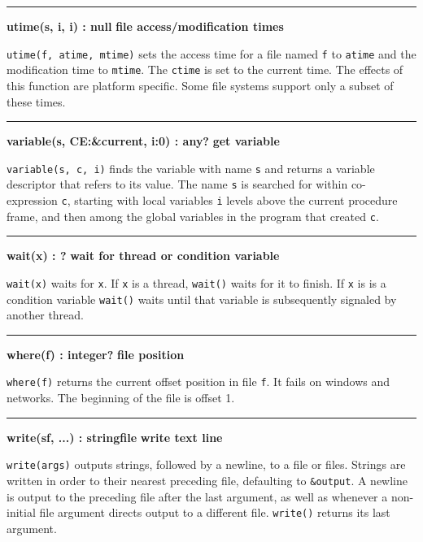 \bigskip\hrule\vspace{0.1cm}
\noindent
{\bf utime(s, i, i) : null } \hfill {\bf file access/modification times}

\noindent
\texttt{utime(f, atime, mtime)} sets the access
time for a file named \texttt{f} to \texttt{atime} and the modification
time to \texttt{mtime}. The \texttt{ctime} is set to the current time.
The effects of this function are platform specific. Some file systems
support only a subset of these times.

\bigskip\hrule\vspace{0.1cm}
\noindent
{\bf variable(s, CE:\&current, i:0) : any? } \hfill {\bf get variable}

\noindent
{}\texttt{variable(s, c, i)} finds the variable
with name \texttt{s} and returns a variable descriptor that refers to
its value. The name \texttt{s} is searched for within co-expression
\texttt{c}, starting with local variables \texttt{i} levels above the
current procedure frame, and then among the global variables in the
program that created \texttt{c}.

\bigskip\hrule\vspace{0.1cm}
\noindent
{\bf wait(x) : ? } \hfill {\bf wait for thread or condition variable}

\noindent
{}\texttt{wait(x)} waits for \texttt{x}. If \texttt{x} is
a thread, \texttt{wait()} waits for it to finish. If \texttt{x} is
is a condition variable \texttt{wait()} waits until that variable is
subsequently signaled by another thread.

\bigskip\hrule\vspace{0.1cm}
\noindent
{\bf where(f) : integer? } \hfill {\bf file position}

\noindent
{}\texttt{where(f)} returns the
current offset position in file \texttt{f}. It fails on windows and
networks. The beginning of the file is offset 1.

\bigskip\hrule\vspace{0.1cm}
\noindent
{\bf write(s{\textbar}f, ...) : string{\textbar}file } \hfill {\bf write text line}

\noindent
\texttt{write(args)} outputs strings, followed by a newline, to a file
or files. Strings are written in order to their nearest preceding file,
defaulting to \texttt{\&output}. A newline is output to the preceding
file after the last argument, as well as whenever a non-initial file
argument directs output to a different file.
\texttt{write()} returns its last argument.

